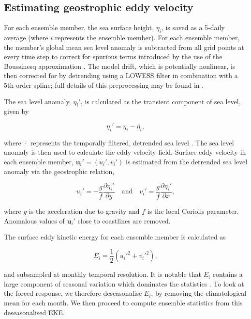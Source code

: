 \documentclass[linenumbers]{agujournal2019}
\begin{document}
\subsection{Estimating geostrophic eddy velocity}
For each ensemble member, the sea surface height, $\eta_i$, is saved as a 5-daily average (where $i$ represents the ensemble member). 
For each ensemble member, the member's global mean sea level anomaly is subtracted from all grid points at every time step to correct for spurious terms introduced by the use of the Boussinesq approximation \citep{Greatbatch1994}. 
The model drift, which is potentially nonlinear, is then corrected for by detrending using a LOWESS filter \citep{Cleveland1979} in combination with a 5th-order spline; full details of this preprocessing may be found in \cite{Close2020}.

The sea level anomaly, $\eta_i'$, is calculated as the transient component of sea level, given by 
\begin{linenomath*}
\begin{equation}
\eta_i' = \eta_i - \overline{\eta_i},
\end{equation}
\end{linenomath*}
where $\overline{\cdot}$ represents the temporally filtered, detrended sea level \citep{Close2020}.
The sea level anomaly is then used to calculate the eddy velocity field.
Surface eddy velocity in each ensemble member, $\mathbf{u}_i' = (u_i', v_i')$ is estimated from the detrended sea level anomaly via the geostrophic relation,
\begin{linenomath*}
\begin{equation}
u_i' = - \frac{g}{f} \frac{\partial \eta_i'}{\partial y} \quad \text{and} \quad v_i' = \frac{g}{f} \frac{\partial \eta_i'}{\partial x},
\end{equation}
\end{linenomath*}
where $g$ is the acceleration due to gravity and $f$ is the local Coriolis parameter.
Anomalous values of $\mathbf{u}_i'$ close to coastlines are removed.

The surface eddy kinetic energy for each ensemble member is calculated as 
\begin{linenomath*}
\begin{equation}
E_i = \frac{1}{2}(u_i'^2 + v_i'^2),
\end{equation}
\end{linenomath*}
and subsampled at monthly temporal resolution.
It is notable that $E_i$ contains a large component of seasonal variation which dominates the statistics \citep{Martinez-Moreno2021}.
To look at the forced response, we therefore deseasonalise $E_i$, by removing the climatological mean for each month.
We then proceed to compute ensemble statistics from this deseasonalised EKE.
\end{document}
